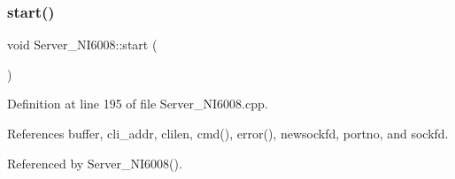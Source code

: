 \subsubsection{\texorpdfstring{start()}{start()}}
{\footnotesize\ttfamily void Server\+\_\+\+N\+I6008\+::start (\begin{DoxyParamCaption}{ }\end{DoxyParamCaption})}



Definition at line 195 of file Server\+\_\+\+N\+I6008.\+cpp.



References buffer, cli\+\_\+addr, clilen, cmd(), error(), newsockfd, portno, and sockfd.



Referenced by Server\+\_\+\+N\+I6008().


